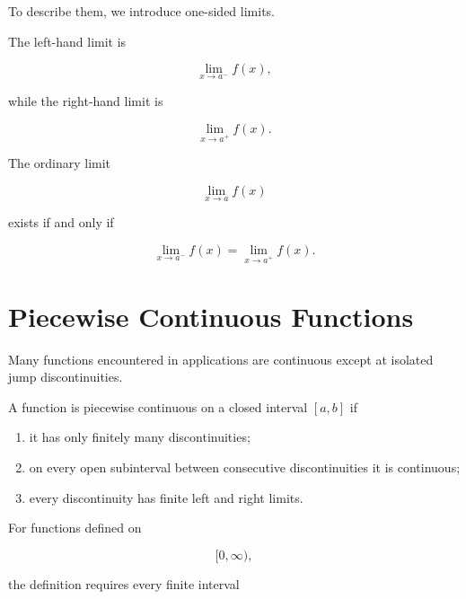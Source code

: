 \documentclass{essay}
\begin{document}
To describe them, we introduce one-sided limits.

\begin{definition}

  The left-hand limit is

  \[ \lim_{x\to a^-}f(x), \]

  while the right-hand limit is

  \[ \lim_{x\to a^+}f(x). \]

\end{definition}

\begin{theorem}

  The ordinary limit

  \[ \lim_{x\to a}f(x) \]

  exists if and only if

  \[ \lim_{x\to a^-}f(x) = \lim_{x\to a^+}f(x). \]

\end{theorem}


\section{Piecewise Continuous Functions}

Many functions encountered in applications are continuous except at isolated
jump discontinuities.

\begin{definition}

  A function is piecewise continuous on a closed interval \([a,b]\) if

  \begin{enumerate}
    \item it has only finitely many discontinuities;

    \item on every open subinterval between consecutive discontinuities it is
      continuous;

    \item every discontinuity has finite left and right limits.

  \end{enumerate}

\end{definition}

For functions defined on

\[ [0,\infty), \]

the definition requires every finite interval
\end{document}
